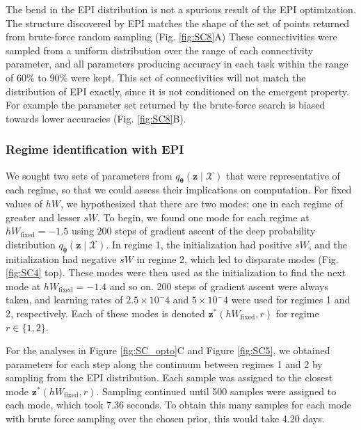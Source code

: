 \documentclass[11pt]{article}
\begin{document}
The bend in the EPI distribution is not a spurious result of the EPI optimization.
The structure discovered by EPI matches the shape of the set of points returned from brute-force random sampling (Fig. \ref{fig:SC8}A) 
These connectivities were sampled from a uniform distribution over the range of each connectivity parameter, and all parameters producing accuracy in each task within the range of 60\% to 90\% were kept.
This set of connectivities will not match the distribution of EPI exactly, since it is not conditioned on the emergent property.
For example the parameter set returned by the brute-force search is biased towards lower accuracies (Fig. \ref{fig:SC8}B).


\subsubsection{Regime identification with EPI} \label{methods_sc_regime}
We sought two sets of parameters from $q_{\bm{\theta}}(\mathbf{z} \mid \mathcal{X})$ that were representative of each regime, so that we could assess their implications on computation.
For fixed values of $hW$, we hypothesized that there are two modes: one in each regime of greater and lesser $sW$.
To begin, we found one mode for each regime at $hW_{\text{fixed}} = -1.5$ using 200 steps of gradient ascent of the deep probability distribution $q_{\bm{\theta}}(\mathbf{z} \mid \mathcal{X})$.
In regime 1, the initialization had positive $sW$, and the initialization had negative $sW$ in regime 2, which led to disparate modes (Fig. \ref{fig:SC4} top).
These modes were then used as the initialization to find the next mode at $hW_{\text{fixed}} = -1.4$ and so on.
200 steps of gradient ascent were always taken, and learning rates of $2.5 \times 10^-4$ and $5 \times 10^-4$ were used for regimes 1 and 2, respectively.
Each of these modes is denoted $\mathbf{z}^*(hW_{\text{fixed}}, r)$ for regime $r \in \{1, 2\}$.

For the analyses in Figure \ref{fig:SC_opto}C and Figure \ref{fig:SC5}, we obtained parameters for each step along the continuum between regimes 1 and 2 by sampling from the EPI distribution.
Each sample was assigned to the closest mode $\mathbf{z}^*(hW_{\text{fixed}}, r)$.
Sampling continued until 500 samples were assigned to each mode, which took 7.36 seconds.
To obtain this many samples for each mode with brute force sampling over the chosen prior, this would take 4.20 days.
\end{document}
